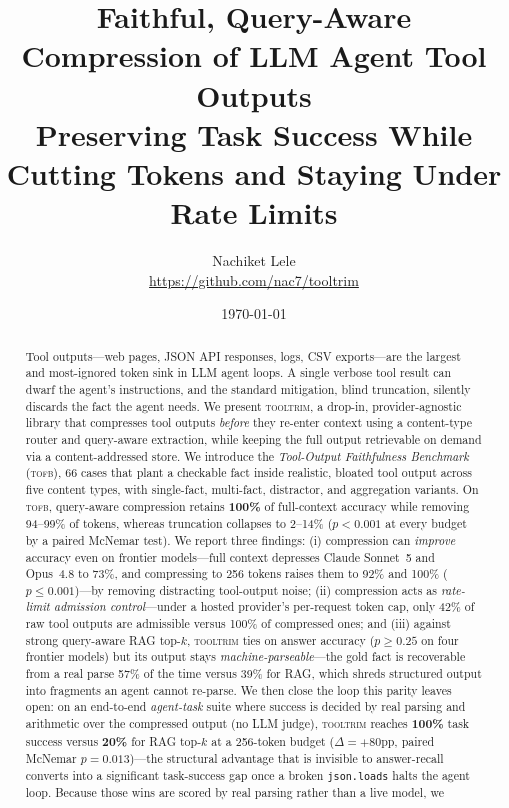 \documentclass[11pt]{article}
\title{\bfseries Faithful, Query-Aware Compression of LLM Agent Tool Outputs\\
\large Preserving Task Success While Cutting Tokens and Staying Under Rate Limits}
\author{Nachiket Lele\\
\small \url{https://github.com/nac7/tooltrim}}
\date{\today}
\newcommand{\tooltrim}{\textsc{tooltrim}}
\newcommand{\tofb}{\textsc{tofb}}
\begin{document}
\maketitle

\begin{abstract}
Tool outputs---web pages, JSON API responses, logs, CSV exports---are the
largest and most-ignored token sink in LLM agent loops. A single verbose tool
result can dwarf the agent's instructions, and the standard mitigation, blind
truncation, silently discards the fact the agent needs. We present \tooltrim, a
drop-in, provider-agnostic library that compresses tool outputs \emph{before}
they re-enter context using a content-type router and query-aware extraction,
while keeping the full output retrievable on demand via a content-addressed
store. We introduce the \emph{Tool-Output Faithfulness Benchmark} (\tofb), 66
cases that plant a checkable fact inside realistic, bloated tool output across
five content types, with single-fact, multi-fact, distractor, and aggregation
variants. On \tofb, query-aware compression retains \textbf{100\%} of
full-context accuracy while removing 94--99\% of tokens, whereas truncation
collapses to 2--14\% ($p<0.001$ at every budget by a paired McNemar test). We
report three findings: (i) compression can \emph{improve} accuracy even on
frontier models---full context depresses Claude Sonnet~5 and Opus~4.8 to 73\%, and
compressing to 256 tokens raises them to 92\% and 100\% ($p{\leq}0.001$)---by
removing distracting tool-output noise; (ii) compression acts
as \emph{rate-limit admission control}---under a hosted provider's per-request
token cap, only 42\% of raw tool outputs are admissible versus 100\% of
compressed ones; and (iii) against strong query-aware RAG top-$k$, \tooltrim{}
ties on answer accuracy ($p\geq 0.25$ on four frontier models) but its output
stays \emph{machine-parseable}---the gold fact is recoverable from a real parse
57\% of the time versus 39\% for RAG, which shreds structured output into
fragments an agent cannot re-parse. We then close the loop this parity leaves
open: on an end-to-end \emph{agent-task} suite where success is decided by real
parsing and arithmetic over the compressed output (no LLM judge), \tooltrim{}
reaches \textbf{100\%} task success versus \textbf{20\%} for RAG top-$k$ at a
256-token budget ($\Delta{=}{+}80$pp, paired McNemar $p{=}0.013$)---the
structural advantage that is invisible to answer-recall converts into a
significant task-success gap once a broken \texttt{json.loads} halts the agent
loop. Because those wins are scored by real parsing rather than a live model, we

\end{abstract}
\end{document}
